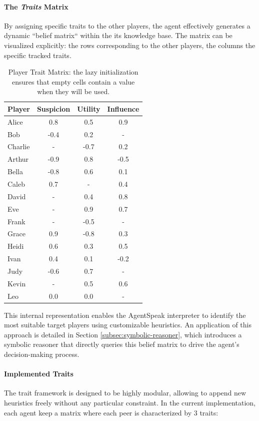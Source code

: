 \paragraph{The \emph{Traits} Matrix}
By assigning specific traits to the other players, the agent effectively generates a dynamic ``belief matrix`` within the its knowledge base. 
The matrix can be visualized explicitly: the rows corresponding to the other players, the columns the specific tracked traits.

\begin{table}[h]
\centering
\begin{tabular}{lccc}
\hline
\textbf{Player} & \textbf{Suspicion} & \textbf{Utility} & \textbf{Influence} \\
\hline
Alice & 0.8 & 0.5 & 0.9 \\
Bob & -0.4 & 0.2 & - \\
Charlie & - & -0.7 & 0.2 \\
Arthur & -0.9 & 0.8 & -0.5 \\
Bella & -0.8 & 0.6 & 0.1 \\
Caleb & 0.7 & - & 0.4 \\
David & - & 0.4 & 0.8 \\
Eve & - & 0.9 & 0.7 \\
Frank & - & -0.5 & - \\
Grace & 0.9 & -0.8 & 0.3 \\
Heidi & 0.6 & 0.3 & 0.5 \\
Ivan & 0.4 & 0.1 & -0.2 \\
Judy & -0.6 & 0.7 & - \\
Kevin & - & 0.5 & 0.6 \\
Leo & 0.0 & 0.0 & - \\
\hline
\end{tabular}
\caption{Player Trait Matrix: the lazy initialization ensures that empty cells contain a value when they will be used.}
\end{table}

This internal representation enables the AgentSpeak interpreter to identify the most suitable target players using customizable heuristics. An application of this approach is detailed in Section \ref{subsec:symbolic-reasoner}, which introduces a symbolic reasoner that directly queries this belief matrix to drive the agent's decision-making process.

\paragraph{Implemented Traits}
The trait framework is designed to be highly modular, allowing to append new heuristics freely without any particular constraint. In the current implementation, each agent keep a matrix where each peer is characterized by 3 traits:

